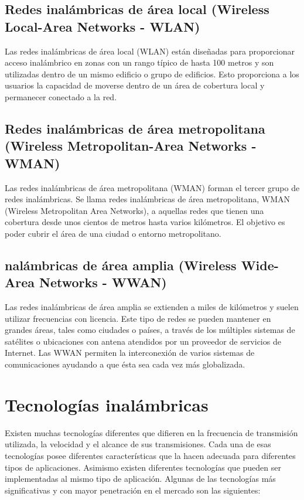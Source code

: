 	\subsection{Redes inalámbricas de área local (Wireless Local-Area Networks - WLAN)}
	Las redes inalámbricas de área local (WLAN) están diseñadas para proporcionar acceso inalámbrico en zonas con un rango típico de hasta 100 metros y son utilizadas dentro de un mismo edificio o grupo de edificios. Esto proporciona a los usuarios la capacidad de moverse dentro de un área de cobertura local y permanecer conectado a la red. 
	
	\subsection{Redes inalámbricas de área metropolitana (Wireless Metropolitan-Area Networks - WMAN)}
	Las redes inalámbricas de área metropolitana (WMAN) forman el tercer grupo de redes inalámbricas. Se llama redes inalámbricas de área metropolitana, WMAN (Wireless Metropolitan Area Networks), a aquellas redes que tienen una cobertura desde unos cientos de metros hasta varios kilómetros. El objetivo es poder cubrir el área de una ciudad o entorno metropolitano. 
	
	\subsection{nalámbricas de área amplia (Wireless Wide-Area Networks - WWAN)}
	Las redes inalámbricas de área amplia se extienden a miles de kilómetros y suelen utilizar frecuencias con licencia. Este tipo de redes se pueden mantener en grandes áreas, tales como ciudades o países, a través de los múltiples sistemas de satélites o ubicaciones con antena atendidos por un proveedor de servicios de Internet. Las WWAN permiten la interconexión de varios sistemas de comunicaciones ayudando a que ésta sea cada vez más globalizada.

	\section{Tecnologías inalámbricas}
	Existen muchas tecnologías diferentes que difieren en la frecuencia de transmisión utilizada, la velocidad y el alcance de sus transmisiones. Cada una de esas tecnologías posee diferentes características que la hacen adecuada para diferentes tipos de aplicaciones. Asimismo existen diferentes tecnologías que pueden ser implementadas al mismo tipo de aplicación. Algunas de las tecnologías más significativas y con mayor penetración en el mercado son las siguientes:
	
